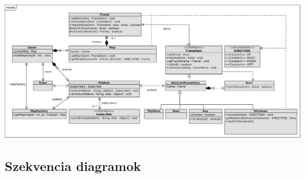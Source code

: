 		\begin{center}
			\includegraphics[scale=0.7, angle=-90]{resources/model.png}
		\end{center}
			
	\subsection{Szekvencia diagramok}
	
